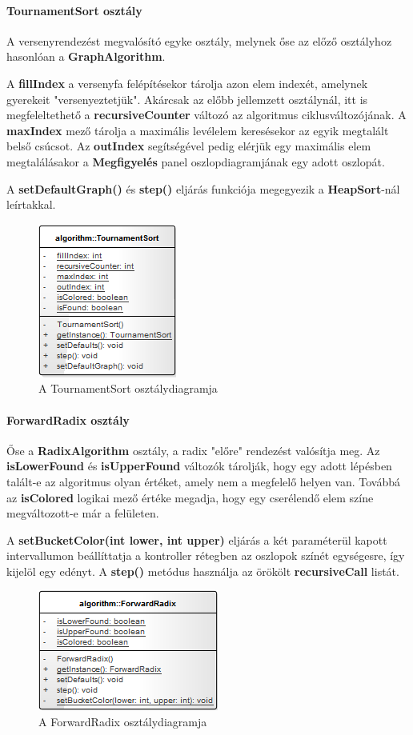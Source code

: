 \documentclass{elteikthesis}
\begin{document}
\paragraph{TournamentSort osztály}
A versenyrendezést megvalósító egyke osztály, melynek őse az előző osztályhoz hasonlóan a \textbf{GraphAlgorithm}.\par
A \textbf{fillIndex} a versenyfa felépítésekor tárolja azon elem indexét, amelynek gyerekeit "versenyeztetjük". Akárcsak az előbb jellemzett osztálynál, itt is megfeleltethető a \textbf{recursiveCounter} változó az algoritmus ciklusváltozójának. A \textbf{maxIndex} mező tárolja a maximális levélelem keresésekor az egyik megtalált belső csúcsot. Az \textbf{outIndex} segítségével pedig elérjük egy maximális elem megtalálásakor a \textbf{Megfigyelés} panel oszlopdiagramjának egy adott oszlopát.\par
A \textbf{setDefaultGraph()} és \textbf{step()} eljárás funkciója megegyezik a \textbf{HeapSort}-nál leírtakkal.
\begin{figure}[H]
	\centering
	\includegraphics{pics/class/TournamentSort.png}
	\caption{A TournamentSort osztálydiagramja}
\end{figure}
\paragraph{ForwardRadix osztály}
Őse a \textbf{RadixAlgorithm} osztály, a radix "előre" rendezést valósítja meg.
Az \textbf{isLowerFound} és \textbf{isUpperFound} változók tárolják, hogy egy adott lépésben talált-e az algoritmus olyan értéket, amely nem a megfelelő helyen van. Továbbá az \textbf{isColored} logikai mező értéke megadja, hogy egy cserélendő elem színe megváltozott-e már a felületen.\par
A \textbf{setBucketColor(int lower, int upper)} eljárás a két paraméterül kapott intervallumon beállíttatja a kontroller rétegben az oszlopok színét egységesre, így kijelöl egy edényt. A \textbf{step()} metódus használja az örökölt \textbf{recursiveCall} listát.
\begin{figure}[H]
	\centering
	\includegraphics{pics/class/ForwardRadix.png}
	\caption{A ForwardRadix osztálydiagramja}
\end{figure}
\end{document}
